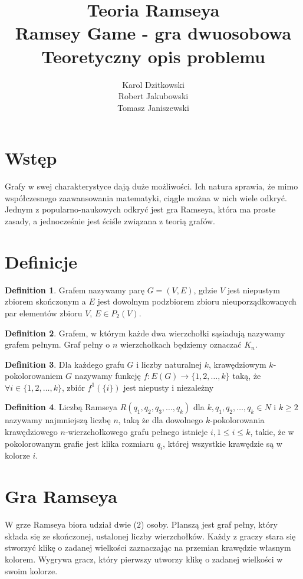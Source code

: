 \documentclass[11pt,a4paper]{article}
\author{
	Karol Dzitkowski\\
	Robert Jakubowski\\
	Tomasz Janiszewski
}
\title{
	Teoria Ramseya\\
	\huge{Ramsey Game - gra dwuosobowa}\\
	Teoretyczny opis problemu
 }
\theoremstyle{definition}
\newtheorem{definition}{Definition}[section]
\theoremstyle{remark}
\begin{document}
\maketitle
\newpage

\tableofcontents
\newpage

\section{Wstęp}
Grafy w swej charakterystyce dają duże możliwości.
 Ich natura sprawia, że mimo współczesnego zaawansowania matematyki,
 ciągle można w nich wiele odkryć. Jednym z popularno-naukowych odkryć jest gra Ramseya,
 która ma proste zasady, a jednocześnie jest ściśle związana z teorią grafów.

\section{Definicje}
\begin{definition}
Grafem nazywamy parę $G=(V,E)$, gdzie $V$ jest niepustym zbiorem skończonym a $E$ jest dowolnym
podzbiorem zbioru nieuporządkowanych par elementów zbioru $V$, $E \in P_2(V)$.
\end{definition}

\begin{definition}
Grafem, w którym każde dwa wierzchołki sąsiadują nazywamy grafem pełnym.
Graf pełny o $n$ wierzchołkach będziemy oznaczać $K_n$.
\end{definition}

\begin{definition}
Dla każdego grafu $G$ i liczby naturalnej $k$, krawędziowym $k$-pokolorowaniem $G$ nazywamy
funkcję $f:E(G)\rightarrow\{1,2, \dots ,k\}$ taką, że
$\forall i \in \{1,2, \dots ,k\}$, zbiór $f^1(\{i\})$ jest niepusty i
niezależny
\end{definition}

\begin{definition}
Liczbą Ramseya  $R (q_1, q_2, q_3, \ldots, q_k )$  dla
$k, q_1, q_2, \ldots, q_k \in N$ i
$k \ge 2$
nazywamy najmniejszą liczbę $n$,
taką że dla dowolnego $k$-pokolorowania krawędziowego $n$-wierzchołkowego grafu pełnego istnieje
$i, 1 \le i \le k$, takie, że w pokolorowanym grafie jest klika rozmiaru $q_i$,
której wszystkie krawędzie są w kolorze $i$.
\end{definition}

\section{Gra Ramseya}
W grze Ramseya biora udział dwie ($2$) osoby.
Planszą jest graf pełny, który składa się ze skończonej, ustalonej liczby wierzchołków.
Każdy z graczy stara się stworzyć klikę o zadanej wielkości zaznaczając
na przemian krawędzie własnym kolorem. Wygrywa gracz,
który pierwszy utworzy klikę o zadanej wielkości w swoim kolorze.
\end{document}

